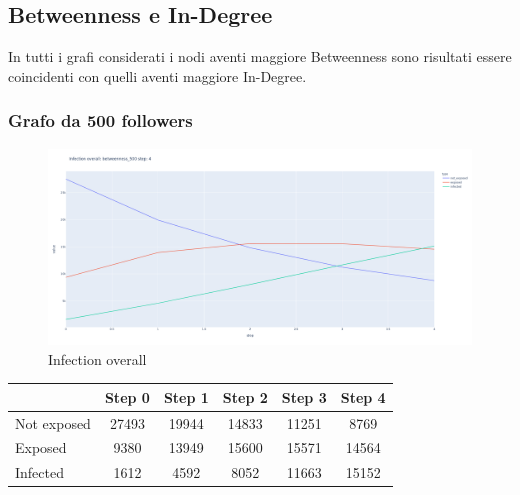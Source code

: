     \subsection{Betweenness e In-Degree}
    In tutti i grafi considerati i nodi aventi maggiore Betweenness sono risultati essere coincidenti con quelli aventi maggiore In-Degree.
        \subsubsection{Grafo da 500 followers}
            \begin{figure}[H]
                \includegraphics[width=16cm]{resources/charts/btw_500_line.png}
                \caption{Infection overall}
                \label{fig:btw_2000_line}
            \end{figure}
            
            \begin{table}[H]
                \centering
                \begin{tabular}{|l|c|c|c|c|c|}
                \hline
                            & Step 0 & Step 1 & Step 2 & Step 3 & Step 4 \\ \hline
                Not exposed & 27493  & 19944  & 14833  & 11251  & 8769   \\ \hline
                Exposed     & 9380   & 13949  & 15600  & 15571  & 14564  \\ \hline
                Infected    & 1612   & 4592   & 8052   & 11663  & 15152  \\ \hline
                \end{tabular}
            \end{table}
            
